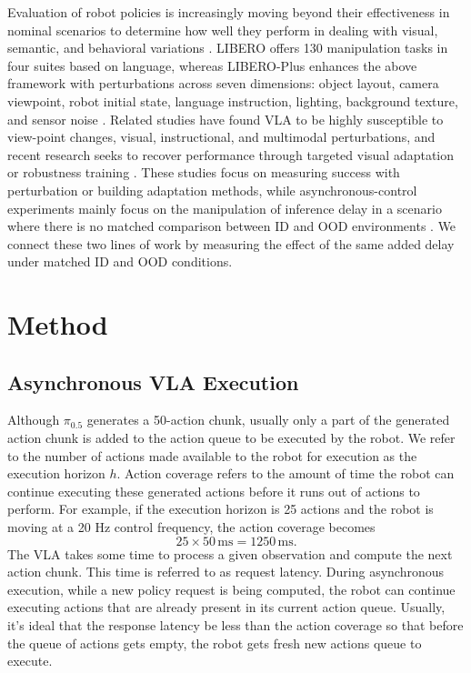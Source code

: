 \documentclass{article}
\begin{document}
Evaluation of robot policies is increasingly moving beyond their effectiveness in nominal scenarios to determine how well they perform in dealing with visual, semantic, and behavioral variations \cite{6} \cite{19} \cite{20}. LIBERO offers 130 manipulation tasks in  four suites based on language, whereas LIBERO-Plus enhances the above framework with perturbations across seven dimensions: object layout, camera viewpoint, robot initial state, language instruction, lighting, background texture, and sensor noise \cite{6} \cite{5}. Related studies have found VLA to be highly susceptible to view-point changes, visual, instructional, and multimodal perturbations, and recent research seeks to recover performance through targeted visual adaptation or robustness training \cite{5} \cite{21} \cite{22}. These studies focus on measuring success with perturbation or building adaptation methods, while asynchronous-control experiments mainly focus on the manipulation of inference delay in a scenario where there is no matched comparison between ID and OOD environments  \cite{3} \cite{4}. We connect these two lines of work by measuring the effect of the same added delay under matched ID and OOD conditions.

\section{Method}
\label{gen_inst}
\subsection{Asynchronous VLA Execution}

Although \(\pi_{0.5}\) generates a 50-action chunk, usually only a part of the generated action chunk is added to the action queue to be executed by the robot. We refer to the number of actions made available to the robot for execution as the execution horizon \(h\). Action coverage refers to the amount of time the robot can continue executing these generated actions before it runs out of actions to perform. For example, if the execution horizon is 25 actions and the robot is moving at a 20 Hz control frequency, the action coverage becomes
\[
25 \times 50\,\mathrm{ms} = 1250\,\mathrm{ms}.
\]
The VLA takes some time to process a given observation and compute the next action chunk. This time is referred to as request latency. During asynchronous execution, while a new policy request is being computed, the robot can continue executing actions that are already present in its current action queue. Usually, it's ideal that the response latency be less than the action coverage so that before the queue of actions gets empty, the robot gets fresh new actions queue to execute.
\end{document}
